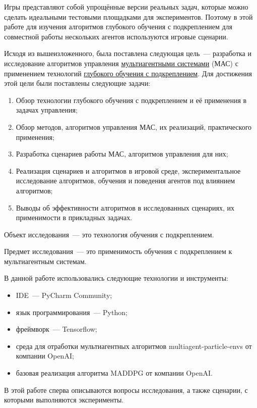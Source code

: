 Игры представляют собой упрощённые версии реальных задач, которые можно сделать идеальными тестовыми площадками для экспериментов. Поэтому в этой работе для изучения алгоритмов глубокого обучения с подкреплением для совместной работы нескольких агентов используются игровые сценарии.

Исходя из вышеизложенного, была поставлена следующая цель~--- разработка и исследование алгоритмов управления \hyperref[acr:rl]{мультиагентными системами} (МАС) с применением технологий \hyperref[acr:drl]{глубокого обучения с подкреплением}. Для достижения этой цели были поставлены следующие задачи:

\begin{enumerate}
    \item Обзор технологии глубокого обучения с подкреплением и её применения в задачах управления;
    \item Обзор методов, алгоритмов управления МАС, их реализаций, практического применения;
    \item Разработка сценариев работы МАС, алгоритмов управления для них;
    \item Реализация сценариев и алгоритмов в игровой среде, экспериментальное исследование алгоритмов, обучения и поведения агентов под влиянием алгоритмов;
    \item Выводы об эффективности алгоритмов в исследованных сценариях, их применимости в прикладных задачах.
\end{enumerate}

Объект исследования~--- это технология обучения с подкреплением.

Предмет исследования~--- это применимость обучения с подкреплением к мультиагентным системам.

В данной работе использовались следующие технологии и инструменты:

\begin{itemize}
    \item IDE~--- PyCharm Community;
    \item язык программирования~--- Python;
    \item фреймворк~--- Tensorflow;
    \item среда для отработки мультиагентных алгоритмов multiagent-particle-envs \cite{multiagent-particle-envs} от компании OpenAI;
    \item базовая реализация алгоритма MADDPG \cite{lowe2017multiagent} от компании OpenAI.
\end{itemize}

В этой работе сперва описываются вопросы исследования, а также сценарии, с которыми выполняются эксперименты.

